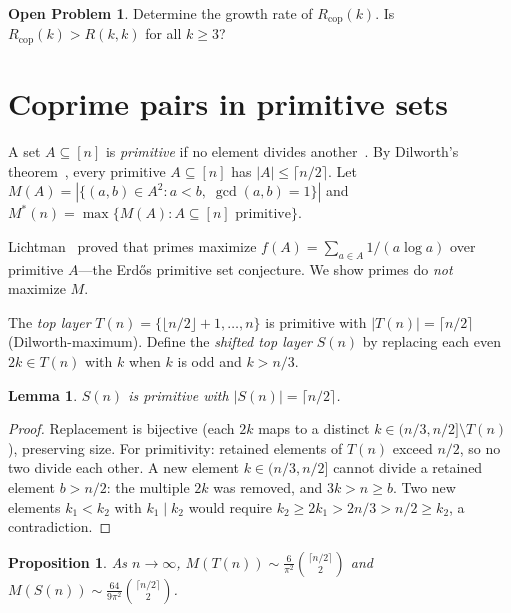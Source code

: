 \documentclass[11pt]{article}
\theoremstyle{plain}
\newtheorem{lemma}[theorem]{Lemma}
\newtheorem{proposition}[theorem]{Proposition}
\theoremstyle{definition}
\newtheorem{problem}[theorem]{Open Problem}
\newcommand{\Rcop}{R_{\mathrm{cop}}}
\begin{document}
\begin{problem}\label{prob:rcop}
Determine the growth rate of $\Rcop(k)$. Is $\Rcop(k)>R(k,k)$ for
all $k\ge 3$?
\end{problem}

\section{Coprime pairs in primitive sets}\label{sec:prim}

A set $A\subseteq[n]$ is \emph{primitive} if no element divides
another~\cite{erdos1935}. By Dilworth's theorem~\cite{dilworth1950},
every primitive $A\subseteq[n]$ has $|A|\le\lceil n/2\rceil$.
Let $M(A)=|\{(a,b)\in A^2:a<b,\;\gcd(a,b)=1\}|$ and
$M^*(n)=\max\{M(A):A\subseteq[n]\text{ primitive}\}$.

Lichtman~\cite{lichtman2023} proved that primes maximize
$f(A)=\sum_{a\in A}1/(a\log a)$ over primitive $A$---the Erd\H{o}s
primitive set conjecture. We show primes do \emph{not} maximize $M$.

The \emph{top layer} $T(n)=\{\lfloor n/2\rfloor+1,\ldots,n\}$ is
primitive with $|T(n)|=\lceil n/2\rceil$ (Dilworth-maximum).
Define the \emph{shifted top layer} $S(n)$ by replacing each even
$2k\in T(n)$ with $k$ when $k$ is odd and $k>n/3$.

\begin{lemma}\label{lem:prim}
$S(n)$ is primitive with $|S(n)|=\lceil n/2\rceil$.
\end{lemma}

\begin{proof}
Replacement is bijective (each $2k$ maps to a distinct $k\in(n/3,
n/2]\setminus T(n)$), preserving size. For primitivity: retained
elements of $T(n)$ exceed $n/2$, so no two divide each other. A new
element $k\in(n/3,n/2]$ cannot divide a retained element $b>n/2$:
the multiple $2k$ was removed, and $3k>n\ge b$. Two new elements
$k_1<k_2$ with $k_1\mid k_2$ would require $k_2\ge 2k_1>2n/3>
n/2\ge k_2$, a contradiction.
\end{proof}

\begin{proposition}\label{prop:density}
As $n\to\infty$, $M(T(n))\sim\frac{6}{\pi^2}\binom{\lceil
n/2\rceil}{2}$ and $M(S(n))\sim\frac{64}{9\pi^2}\binom{\lceil
n/2\rceil}{2}$.
\end{proposition}
\end{document}
